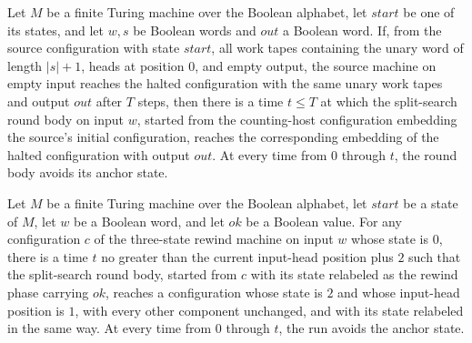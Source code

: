 \begin{lemma}
\label{Turing.FinTM.splitBody_count}
\leanok
{}
Let $M$ be a finite Turing machine over the Boolean alphabet, let $start$ be one of its
states, and let $w,s$ be Boolean words and $out$ a Boolean word. If, from the source
configuration with state $start$, all work tapes containing the unary word of length
$|s|+1$, heads at position $0$, and empty output, the source machine on empty input
reaches the halted configuration with the same unary work tapes and output $out$ after
$T$ steps, then there is a time $t\le T$ at which the split-search round body on input
$w$, started from the counting-host configuration embedding the source's initial
configuration, reaches the corresponding embedding of the halted configuration with
output $out$. At every time from $0$ through $t$, the round body avoids its anchor
state.
\end{lemma}

\begin{lemma}
\label{Turing.FinTM.splitBody_rewind}
\leanok
{}
Let $M$ be a finite Turing machine over the Boolean alphabet, let $start$ be a state of
$M$, let $w$ be a Boolean word, and let $ok$ be a Boolean value. For any configuration
$c$ of the three-state rewind machine on input $w$ whose state is $0$, there is a time
$t$ no greater than the current input-head position plus $2$ such that the split-search
round body, started from $c$ with its state relabeled as the rewind phase carrying $ok$,
reaches a configuration whose state is $2$ and whose input-head position is $1$, with
every other component unchanged, and with its state relabeled in the same way. At every
time from $0$ through $t$, the run avoids the anchor state.
\end{lemma}

